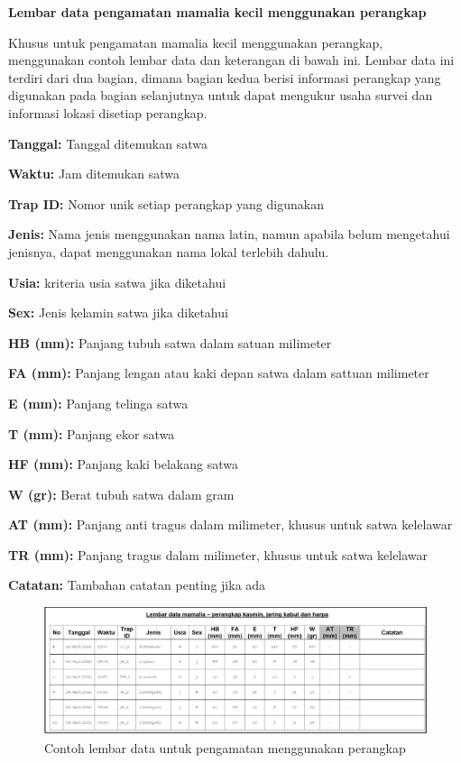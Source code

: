 \documentclass[
  oneside]{book}
\begin{document}
\textbf{Lembar data pengamatan mamalia kecil menggunakan perangkap}

Khusus untuk pengamatan mamalia kecil menggunakan perangkap, menggunakan contoh lembar data dan keterangan di bawah ini. Lembar data ini terdiri dari dua bagian, dimana bagian kedua berisi informasi perangkap yang digunakan pada bagian selanjutnya untuk dapat mengukur usaha survei dan informasi lokasi disetiap perangkap.

\textbf{Tanggal:} Tanggal ditemukan satwa

\textbf{Waktu:} Jam ditemukan satwa

\textbf{Trap ID:} Nomor unik setiap perangkap yang digunakan

\textbf{Jenis:} Nama jenis menggunakan nama latin, namun apabila belum mengetahui jenisnya, dapat menggunakan nama lokal terlebih dahulu.

\textbf{Usia:} kriteria usia satwa jika diketahui

\textbf{Sex:} Jenis kelamin satwa jika diketahui

\textbf{HB (mm):} Panjang tubuh satwa dalam satuan milimeter

\textbf{FA (mm):} Panjang lengan atau kaki depan satwa dalam sattuan milimeter

\textbf{E (mm):} Panjang telinga satwa

\textbf{T (mm):} Panjang ekor satwa

\textbf{HF (mm): }Panjang kaki belakang satwa

\textbf{W (gr):} Berat tubuh satwa dalam gram

\textbf{AT (mm): }Panjang anti tragus dalam milimeter, khusus untuk satwa kelelawar

\textbf{TR (mm):} Panjang tragus dalam milimeter, khusus untuk satwa kelelawar

\textbf{Catatan: }Tambahan catatan penting jika ada

\begin{figure}

{\centering \includegraphics[width=1\linewidth]{images/ldm_pk} 

}

\caption{Contoh lembar data untuk pengamatan menggunakan perangkap}\label{fig:ldmpk}
\end{figure}
\end{document}
